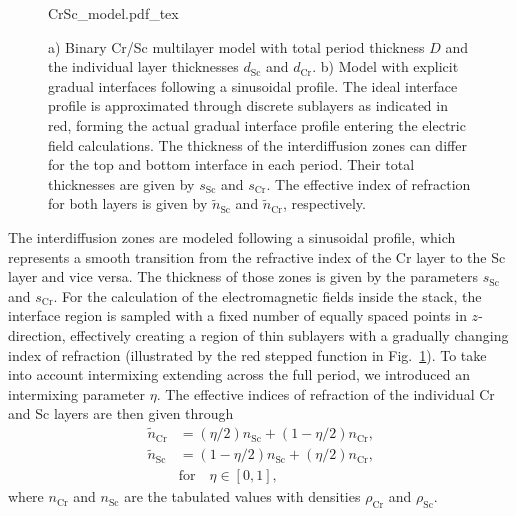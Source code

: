 \begin{figure}[htb]
    \def\svgwidth{\textwidth}
    {CrSc_model.pdf_tex}
    \caption[Binary and gradual Cr/Sc multilayer models.]{a) Binary Cr/Sc multilayer model with total period thickness $D$ and 
the individual layer thicknesses $d_\text{Sc}$ and $d_\text{Cr}$. b) Model with 
explicit gradual interfaces following a sinusoidal profile. The ideal interface 
profile is approximated through discrete sublayers as indicated in red, forming 
the actual gradual interface profile entering the electric field calculations. 
The thickness of the interdiffusion zones can differ for the top and bottom 
interface in each period. Their total thicknesses are given by $s_\text{Sc}$ 
and $s_\text{Cr}$. The effective index of refraction for both layers is given 
by $\tilde{n}_\text{Sc}$ and $\tilde{n}_\text{Cr}$, respectively.}
    \label{ch_spec:fig_CrScModel}
\end{figure}
The interdiffusion zones are modeled following a sinusoidal profile, which represents a smooth transition from the refractive index of the Cr layer to the Sc layer and vice versa. The thickness of those zones is given by the parameters $s_\text{Sc}$ and $s_\text{Cr}$. For the calculation of the electromagnetic fields inside the stack, the interface region is sampled with a fixed number of equally spaced points in $z$-direction, effectively creating a region of thin sublayers with a gradually changing index of refraction (illustrated by the red stepped function in Fig.~\ref{ch_spec:fig_CrScModel}). To take into account intermixing extending across the full period, we introduced an intermixing parameter $\eta$. The effective indices of refraction of the individual Cr and Sc layers are then given through
\begin{align}
\tilde{n}_\text{Cr} &=(\eta/2) n_\text{Sc} + (1-\eta/2) n_\text{Cr} \text{,} 
\nonumber\\
\tilde{n}_\text{Sc} &=(1-\eta/2) n_\text{Sc} + (\eta/2) n_\text{Cr} \text{,} 
\label{eqn:effective_n} \\
&\text{for} \quad \eta \in [0,1] \text{,}\nonumber
\end{align}
where $n_\text{Cr}$ and $n_\text{Sc}$ are the tabulated values \cite{henke_x-ray_1993} 
with densities $\rho_\text{Cr}$ and $\rho_\text{Sc}$.

